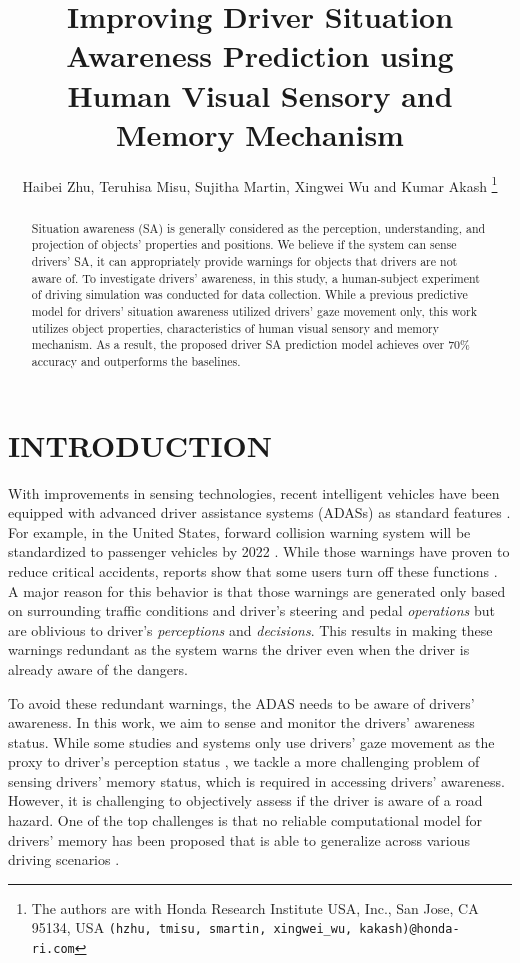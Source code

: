 \documentclass[letterpaper, 10 pt, conference]{ieeeconf}  %
\title{\LARGE \bf Improving Driver Situation Awareness Prediction using\\Human Visual Sensory and Memory Mechanism}
\author{Haibei Zhu, Teruhisa Misu, Sujitha Martin, Xingwei Wu and Kumar Akash%
\thanks{The authors are with Honda Research Institute USA, Inc., San Jose, CA 95134, USA {\tt\small (hzhu, tmisu, smartin, xingwei\_wu, kakash)@honda-ri.com}}%
}
\begin{document}
\maketitle
\thispagestyle{empty}
\pagestyle{empty}


\begin{abstract}

Situation awareness (SA) is generally considered as the perception, understanding, and projection of objects' properties and positions. We believe if the system can sense drivers' SA, it can appropriately provide warnings for objects that drivers are not aware of. To investigate drivers' awareness, in this study, a human-subject experiment of driving simulation was conducted for data collection. While a previous predictive model for drivers' situation awareness utilized drivers' gaze movement only, this work utilizes object properties, characteristics of human visual sensory and memory mechanism. As a result, the proposed driver SA prediction model achieves over 70\% accuracy and outperforms the baselines.

\end{abstract}


\section{INTRODUCTION}

With improvements in sensing technologies, recent intelligent vehicles have been equipped with advanced driver assistance systems (ADASs) as standard features \cite{broggi2016intelligent, zhu2017overview}. For example, in the United States, forward collision warning system will be standardized to passenger vehicles by 2022 \cite{NHTSA2016a}. While those warnings have proven to reduce critical accidents, reports show that some users turn off these functions \cite{IIHS2016}. A major reason for this behavior is that those warnings are generated only based on surrounding traffic conditions and driver's steering and pedal {\it operations} but are oblivious to driver's {\it perceptions} and {\it decisions}. This results in making these warnings redundant as the system warns the driver even when the driver is already aware of the dangers.

To avoid these redundant warnings, the ADAS needs to be aware of drivers' awareness. In this work, we aim to sense and monitor the drivers' awareness status. While some studies and systems only use drivers' gaze movement as the proxy to driver's perception status \cite{kapitaniak2015application, topolvsek2016examination}, we tackle a more challenging problem of sensing drivers' memory status, which is required in accessing drivers' awareness. However, it is challenging to objectively assess if the driver is aware of a road hazard. One of the top challenges is that no reliable computational model for drivers' memory has been proposed that is able to generalize across various driving scenarios \cite{gugerty2011situation}.
\end{document}
